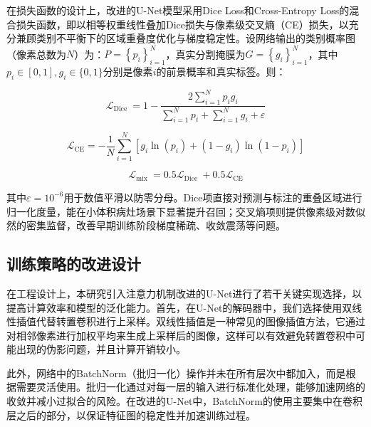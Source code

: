 在损失函数的设计上，改进的U-Net模型采用Dice Loss和Cross-Entropy Loss的混合损失函数，即以相等权重线性叠加Dice损失与像素级交叉熵（CE）损失，以充分兼顾类别不平衡下的区域重叠度优化与梯度稳定性。设网络输出的类别概率图（像素总数为$N$）为：$ P=\left\{p_{i}\right\}_{i=1}^{N} $，真实分割掩膜为$ G=\left\{g_{i}\right\}_{i=1}^{N} $，其中$ p_{i} \in[0,1], g_{i} \in\{0,1\}$分别是像素$i$的前景概率和真实标签。则：

\begin{equation}
    \mathcal{L}_{\text {Dice }}=1-\frac{2 \sum_{i=1}^{N} p_{i} g_{i}}{\sum_{i=1}^{N} p_{i}+\sum_{i=1}^{N} g_{i}+\varepsilon}
\end{equation}

\begin{equation}
    \mathcal{L}_{\mathrm{CE}}=-\frac{1}{N} \sum_{i=1}^{N}\left[g_{i} \ln \left(p_{i}\right)+\left(1-g_{i}\right) \ln \left(1-p_{i}\right)\right]
\end{equation}

\begin{equation}
    \mathcal{L}_{\text {mix }}=0.5 \mathcal{L}_{\text {Dice }}+0.5 \mathcal{L}_{\mathrm{CE}}
\end{equation}

其中$ \varepsilon=10^{-6} $用于数值平滑以防零分母。Dice项直接对预测与标注的重叠区域进行归一化度量，能在小体积病灶场景下显著提升召回；交叉熵项则提供像素级对数似然的密集监督，改善早期训练阶段梯度稀疏、收敛震荡等问题。

\subsection{训练策略的改进设计}

在工程设计上，本研究引入注意力机制改进的U-Net进行了若干关键实现选择，以提高计算效率和模型的泛化能力。首先，在U-Net的解码器中，我们选择使用双线性插值代替转置卷积进行上采样。双线性插值是一种常见的图像插值方法，它通过对相邻像素进行加权平均来生成上采样后的图像，这样可以有效避免转置卷积中可能出现的伪影问题，并且计算开销较小。

此外，网络中的BatchNorm（批归一化）操作并未在所有层次中都加入，而是根据需要灵活使用。批归一化通过对每一层的输入进行标准化处理，能够加速网络的收敛并减小过拟合的风险。在改进的U-Net中，BatchNorm的使用主要集中在卷积层之后的部分，以保证特征图的稳定性并加速训练过程。